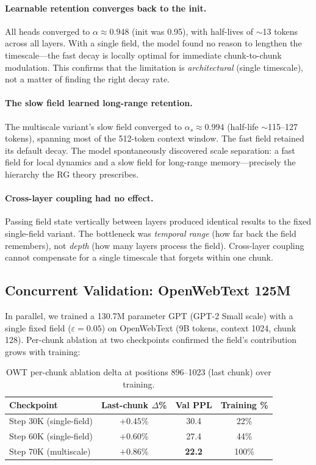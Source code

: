 \documentclass[11pt,a4paper]{article}
\newcommand{\evap}{\varepsilon}
\newcommand{\retain}{\alpha}
\begin{document}
\paragraph{Learnable retention converges back to the init.}
All heads converged to $\retain \approx 0.948$ (init was 0.95),
with half-lives of $\sim$13 tokens across all layers.  With a single
field, the model found no reason to lengthen the timescale---the
fast decay is locally optimal for immediate chunk-to-chunk modulation.
This confirms that the limitation is \emph{architectural} (single
timescale), not a matter of finding the right decay rate.

\paragraph{The slow field learned long-range retention.}
The multiscale variant's slow field converged to
$\retain_s \approx 0.994$ (half-life $\sim$115--127 tokens),
spanning most of the 512-token context window.  The fast field
retained its default decay.  The model spontaneously discovered
scale separation: a fast field for local dynamics and a slow field
for long-range memory---precisely the hierarchy the RG theory
prescribes.

\paragraph{Cross-layer coupling had no effect.}  Passing field state
vertically between layers produced identical results to the fixed
single-field variant.  The bottleneck was \emph{temporal range} (how
far back the field remembers), not \emph{depth} (how many layers
process the field).  Cross-layer coupling cannot compensate for a
single timescale that forgets within one chunk.

\subsection{Concurrent Validation: OpenWebText 125M}

In parallel, we trained a 130.7M parameter GPT (GPT-2 Small scale)
with a single fixed field ($\evap = 0.05$) on OpenWebText (9B tokens,
context 1024, chunk 128).  Per-chunk ablation at two checkpoints
confirmed the field's contribution grows with training:

\begin{table}[h]
\centering
\caption{OWT per-chunk ablation delta at positions 896--1023
  (last chunk) over training.}
\label{tab:owt-trend}
\begin{tabular}{@{}lccc@{}}
\toprule
Checkpoint & Last-chunk $\Delta$\% & Val PPL & Training \% \\
\midrule
Step 30K (single-field) & $+0.45$\% & 30.4 & 22\% \\
Step 60K (single-field) & $+0.60$\% & 27.4 & 44\% \\
\midrule
Step 70K (multiscale) & $+0.86$\% & \textbf{22.2} & 100\% \\
\bottomrule
\end{tabular}
\end{table}
\end{document}
